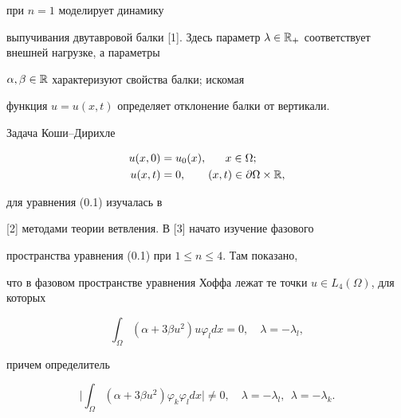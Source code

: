 при $n=1$ моделирует динамику


выпучивания двутавровой балки [1]. Здесь параметр $\lambda\in\Bbb


R_{+}$ соответствует внешней нагрузке, а параметры


$\alpha,\beta\in\Bbb R$ характеризуют свойства балки; искомая


функция $u=u(x,t)$ определяет отклонение балки от вертикали.





Задача Коши--Дирихле


\begin{equation}


\begin{split}


u(x,0)&=u_{0}(x),\quad \ \


x\in\Omega;\\


u(x,t)&=0,\qquad (x,t)\in\partial\Omega\times\Bbb R,


\end{split}


\end{equation}


для уравнения (0.1) изучалась в


[2] методами теории ветвления. В [3] начато изучение фазового


пространства уравнения (0.1) при $1\leq n\leq 4$. Там показано,


что в фазовом пространстве уравнения Хоффа лежат те точки $u\in


L_{4}(\Omega)$, для которых


\begin{equation}


\int_{\Omega}(\alpha + 3\beta u^{2})u


\varphi_{l} dx=0, \quad\lambda=-\lambda_{l},


\end{equation}


причем определитель


\begin{equation}


\bigg|\int_{\Omega}(\alpha + 3 \beta


u^{2})\varphi_{k} \varphi_{l} dx\bigg|\neq 0,


\quad \lambda=-\lambda_{l},\ \  \lambda=-\lambda_{k}.


\end{equation}


